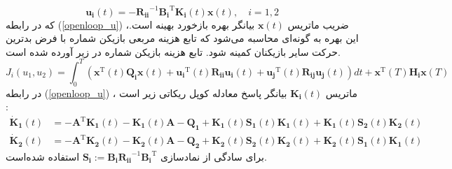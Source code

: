 \begin{equation}\label{openloop_u}
	\boldsymbol{u_i}(t) = -\boldsymbol{R_{ii}}^{-1}\boldsymbol{B_i}^\mathrm{T}\boldsymbol{K_{i}}(t)\boldsymbol{x}(t),\quad i = 1, 2
\end{equation}
که در رابطه 
(\ref{openloop_u})
،ضریب ماتریس $\boldsymbol{x}(t)$ بیانگر بهره بازخورد بهینه است. این بهره به گونه‌ای محاسبه می‌شود که تابع هزینه مربعی بازیکن شماره  با فرض بدترین حرکت سایر بازیکنان کمینه شود. تابع هزینه بازیکن شماره  در زیر آورده شده است.
 \begin{equation}
	J_i(u_1, u_2) = \int_{0}^{T}\left( \boldsymbol{x} ^\mathrm{T}(t) \boldsymbol{Q_i} \boldsymbol{x}(t)+
	\boldsymbol{u_i} ^\mathrm{T}(t) \boldsymbol{R_{ii}} \boldsymbol{u_i}(t)+
	\boldsymbol{u_j} ^\mathrm{T}(t)\boldsymbol{ R_{ij} u_j}(t)
	\right)dt+
	\boldsymbol{ x} ^\mathrm{T}(T)\boldsymbol{ H_i}\boldsymbol{x}(T) 
\end{equation}
در رابطه 
(\ref{openloop_u})
، ماتریس $\boldsymbol{K_{i}}(t)$ بیانگر پاسخ معادله کوپل ریكاتی
 زیر است
 \cite{diff_game}:
\begin{equation}
\begin{split}
	\boldsymbol{\dot{K}_1}(t) &= -\boldsymbol{A}^\mathrm{T}\boldsymbol{K_1}(t) - \boldsymbol{K_1}(t)\boldsymbol{A} - \boldsymbol{Q_1} +\boldsymbol{K_1}(t)\boldsymbol{S_1}(t)\boldsymbol{K_1}(t) + \boldsymbol{K_1}(t)\boldsymbol{S_2}(t)\boldsymbol{K_2}(t)\\
	\boldsymbol{\dot{K}_2}(t) &= -\boldsymbol{A}^\mathrm{T}\boldsymbol{K_2}(t) - \boldsymbol{K_2}(t)\boldsymbol{A} - \boldsymbol{Q_2} +\boldsymbol{K_2}(t)\boldsymbol{S_2}(t)\boldsymbol{K_2}(t) + \boldsymbol{K_2}(t)\boldsymbol{S_1}(t)\boldsymbol{K_1}(t)
\end{split}
\end{equation}
برای سادگی از نمادسازی
$\boldsymbol{S_i} := \boldsymbol{B_iR_{ii}}^{-1}\boldsymbol{B_i}^\mathrm{T}$
  استفاده شده‌است. 


